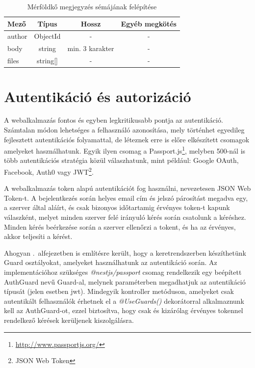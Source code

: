 \documentclass[
]{thesis-ekf}
\theoremstyle{definition}
\theoremstyle{remark}
\begin{document}
	\begin{table}[!h]
		\centering
		\begin{tabular}{|l|c|c|c|} 
			\hline
			\textbf{Mező} & \textbf{Típus} & \textbf{Hossz} & \textbf{Egyéb megkötés} \\ 
			\hline
			author & ObjectId & - & - \\ 
			\hline
			body & string & min. 3 karakter & - \\ 
			\hline
			files & string[] & - & - \\
			\hline
		\end{tabular}
		\caption{Mérföldkő megjegyzés sémájának felépítése}
		\label{tbl:merfoldko_megjegyzes_sema}
	\end{table}
	\newpage
	\section{Autentikáció és autorizáció}
	A webalkalmazás fontos és egyben legkritikusabb pontja az autentikáció. Számtalan módon lehetséges a felhasználó azonosítása, mely történhet egyedileg fejlesztett autentikációs folyamattal, de léteznek erre is előre elkészített csomagok amelyeket használhatunk. Egyik ilyen csomag a Passport.js\footnote{\url{http://www.passportjs.org/}}, melyben 500-nál is több autentikációs stratégia közül válaszhatunk, mint például: Google OAuth, Facebook, Auth0 vagy JWT\footnote{JSON Web Token}.
	
	A webalkalmazás token alapú autentikációt fog használni, nevezetesen JSON Web Token-t. A bejelentkezés során helyes email cím és jelszó párosítást megadva egy, a szerver által aláírt, és csak bizonyos időtartamig érvényes token-t kapunk válaszként, melyet minden szerver felé irányuló kérés során csatolunk a kéréshez. Minden kérés beérkezése során a szerver ellenőrzi a tokent, és ha az érvényes, akkor teljesíti a kérést.
	
	Ahogyan \az{\ref{subs:nest}}.~alfejezetben is említésre került, hogy a keretrendszerben készíthetünk Guard osztályokat, amelyeket használhatunk az autentikáció során. Az implementációhoz szükséges \emph{@nestjs/passport} csomag rendelkezik egy beépített AuthGuard nevű Guard-al, melynek paraméterben megadhatjuk az autentikáció típusát (jelen esetben jwt). Mindegyik kontroller metóduson, amelyeket csak autentikált felhasználók érhetnek el a \emph{@UseGuards()} dekorátorral alkalmaznunk kell az AuthGuard-ot, ezzel biztosítva, hogy csak és kizárólag érvényes tokennel rendelkező kérések kerüljenek kiszolgálásra.
	
\end{document}
